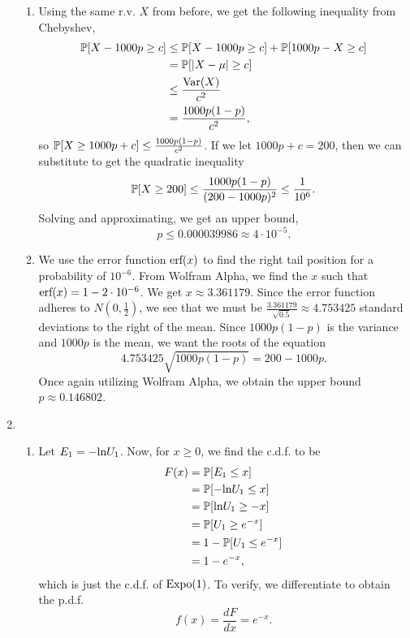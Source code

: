 \begin{enumerate}
\begin{enumerate}
        \item Using the same r.v. $X$ from before, we get the following inequality from Chebyshev,
        \begin{align*}
            \P[X - 1000p \geq c] &\leq \P[X - 1000p \geq c] + \P[1000p - X \geq c] \\
                &= \P[|X - \mu| \geq c] \\
                &\leq \frac{\f{Var}(X)}{c^2} \\
                &= \frac{1000p(1 - p)}{c^2},
        \end{align*}
        so $\P[X \geq 1000p + c] \leq \frac{1000p(1 - p)}{c^2}$. If we let $1000p + c = 200$, then we can substitute to get the quadratic inequality
        \[
        \P[X \geq 200] \leq \frac{1000p(1 - p)}{(200 - 1000p)^2} \leq \frac{1}{10^6}.
        \]
        Solving and approximating, we get an upper bound,
        \[
        p \leq 0.000039986 \approx 4 \cdot 10^{-5}.
        \]
        
        \item We use the error function $\f{erf}(x)$ to find the right tail position for a probability of $10^{-6}$. From Wolfram Alpha, we find the $x$ such that $\f{erf}(x) = 1 - 2 \cdot 10^{-6}$. We get $x \approx 3.361179$. Since the error function adheres to $N(0, \frac{1}{2})$, we see that we must be $\frac{3.361179}{\sqrt{0.5}} \approx 4.753425$ standard deviations to the right of the mean. Since $1000p(1 - p)$ is the variance and $1000p$ is the mean, we want the roots of the equation
        \[
        4.753425\sqrt{1000p(1 - p)} = 200 - 1000p.
        \]
        Once again utilizing Wolfram Alpha, we obtain the upper bound $p \approx 0.146802$.
    \end{enumerate}
    
    \item \begin{enumerate}
        \item Let $E_1 = -\f{ln}U_1$. Now, for $x \geq 0$, we find the c.d.f. to be
        \begin{align*}
            F(x) &= \P[E_1 \leq x] \\
                &= \P[-\f{ln}U_1 \leq x] \\
                &= \P[\f{ln}U_1 \geq -x] \\
                &= \P[U_1 \geq e^{-x}] \\
                &= 1 - \P[U_1 \leq e^{-x}] \\
                &= 1 - e^{-x},
        \end{align*}
        which is just the c.d.f. of $\f{Expo}(1)$. To verify, we differentiate to obtain the p.d.f.
        \[
        f(x) = \frac{dF}{dx} = e^{-x}.
        \]
        

\end{enumerate}
\end{enumerate}
